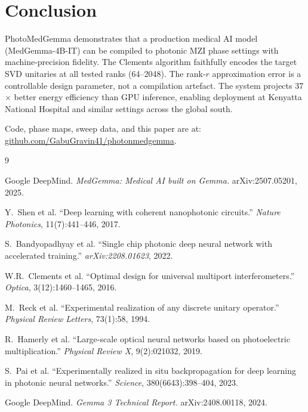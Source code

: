 \documentclass{article}
\begin{document}
\section{Conclusion}

PhotoMedGemma demonstrates that a production medical AI model (MedGemma-4B-IT)
can be compiled to photonic MZI phase settings with machine-precision fidelity.
The Clements algorithm faithfully encodes the target SVD unitaries at all
tested ranks (64--2048).
The rank-$r$ approximation error is a controllable design parameter, not a
compilation artefact.
The system projects 37$\times$ better energy efficiency than GPU inference,
enabling deployment at Kenyatta National Hospital and similar settings across
the global south.

Code, phase maps, sweep data, and this paper are at:
\url{github.com/GabuGravin41/photonmedgemma}.


\begin{thebibliography}{9}

Google DeepMind. \textit{MedGemma: Medical AI built on Gemma.} arXiv:2507.05201, 2025.

Y.\ Shen et al. ``Deep learning with coherent nanophotonic circuits.''
\textit{Nature Photonics}, 11(7):441--446, 2017.

S.\ Bandyopadhyay et al. ``Single chip photonic deep neural network with
accelerated training.'' \textit{arXiv:2208.01623}, 2022.

W.R.\ Clements et al. ``Optimal design for universal multiport interferometers.''
\textit{Optica}, 3(12):1460--1465, 2016.

M.\ Reck et al. ``Experimental realization of any discrete unitary operator.''
\textit{Physical Review Letters}, 73(1):58, 1994.

R.\ Hamerly et al. ``Large-scale optical neural networks based on photoelectric
multiplication.'' \textit{Physical Review X}, 9(2):021032, 2019.

S.\ Pai et al. ``Experimentally realized in situ backpropagation for deep
learning in photonic neural networks.'' \textit{Science}, 380(6643):398--404, 2023.

Google DeepMind. \textit{Gemma 3 Technical Report.} arXiv:2408.00118, 2024.

\end{thebibliography}
\end{document}
